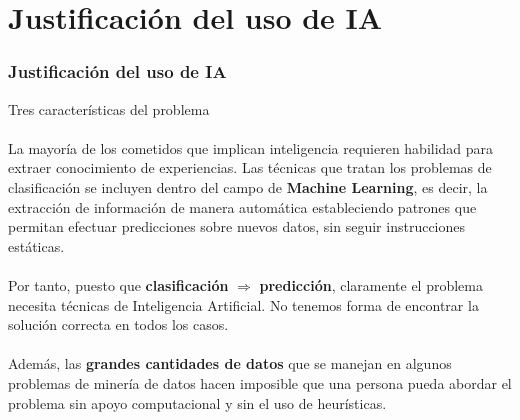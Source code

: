 \documentclass[8pt]{beamer}
\begin{document}
\section{Justificación del uso de IA}
  \begin{frame}
    \frametitle{Justificación del uso de IA}
      {\Large Tres características del problema}
      \\~\\
      \pause
      La mayoría de los cometidos que implican inteligencia requieren habilidad
      para extraer conocimiento de experiencias. Las técnicas que tratan los problemas 
      de clasificación se incluyen dentro del campo de \textbf{Machine Learning},
      es decir, la extracción de información de manera automática estableciendo patrones
      que permitan efectuar predicciones sobre nuevos datos, sin seguir instrucciones 
      estáticas. 
      \pause
      \\~\\
      Por tanto, puesto que \textbf{clasificación} $\Longrightarrow$ 
      \textbf{predicción}, claramente el problema necesita técnicas de Inteligencia 
      Artificial. No tenemos forma de encontrar la solución correcta en todos los casos.
      \pause
      \\~\\
      Además, las \textbf{grandes cantidades de datos} que se manejan en algunos problemas
      de minería de datos hacen imposible que una persona pueda abordar el problema
      sin apoyo computacional y sin el uso de heurísticas.
  \end{frame}
\end{document}
